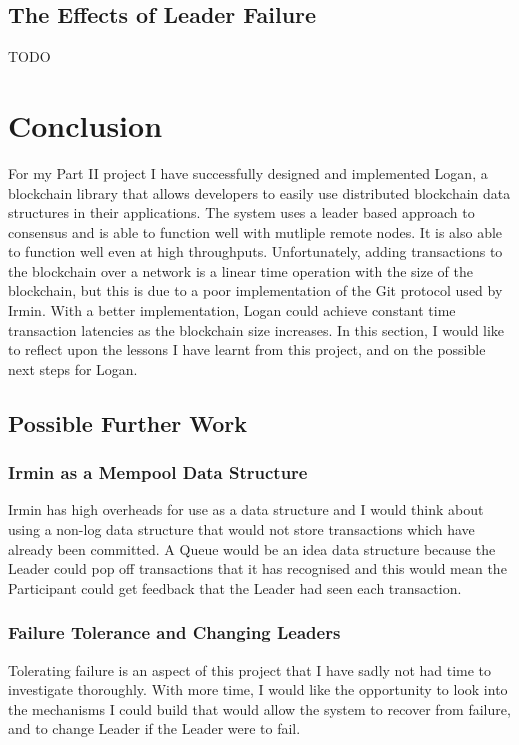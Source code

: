 \documentclass[12pt,a4paper,twoside,openright]{report}
\begin{document}
	\section{The Effects of Leader Failure}

	TODO

	\chapter{Conclusion}
	For my Part II project I have successfully designed and implemented Logan, a blockchain library that allows developers to easily use distributed blockchain data structures in their applications.
	The system uses a leader based approach to consensus and is able to function well with mutliple remote nodes. 
	It is also able to function well even at high throughputs.
	Unfortunately, adding transactions to the blockchain over a network is a linear time operation with the size of the blockchain, but this is due to a poor implementation of the Git protocol used by Irmin. 
	With a better implementation, Logan could achieve constant time transaction latencies as the blockchain size increases.
	In this section, I would like to reflect upon the lessons I have learnt from this project, and on the possible next steps for Logan.

	\section{Possible Further Work}
	\subsection{Irmin as a Mempool Data Structure}
	Irmin has high overheads for use as a data structure and I would think about using a non-log data structure that would not store transactions which have already been committed. 
	A Queue would be an idea data structure because the Leader could pop off transactions that it has recognised and this would mean the Participant could get feedback that the Leader had seen each transaction.

	\subsection{Failure Tolerance and Changing Leaders}
	Tolerating failure is an aspect of this project that I have sadly not had time to investigate thoroughly.
	With more time, I would like the opportunity to look into the mechanisms I could build that would allow the system to recover from failure, and to change Leader if the Leader were to fail.
\end{document}
